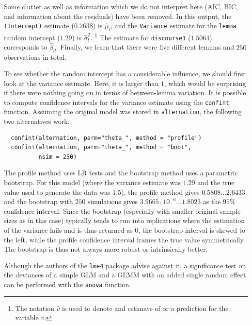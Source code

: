 \documentclass[a4paper,12pt]{article}
\begin{document}
Some clutter as well as information which we do not interpret here (AIC, BIC, and information about the residuals) have been removed.
In this output, the \texttt{(Intercept)} estimate ($0.7638$) is $\hat{\mu}_l$, and the \texttt{Variance} estimate for the \texttt{lemma} random intercept ($1.29$) is $\hat{\sigma}_l^2$.%
\footnote{The notation $\hat{v}$ is used to denote and estimate of or a prediction for the variable $v$.}
The estimate for \texttt{discourse1} ($1.5064$) corresponds to $\hat{\beta}_d$.
Finally, we learn that there were five different lemmas and $250$ observations in total.

To see whether the random intercept has a considerable influence, we should first look at the variance estimate.
Here, it is larger than $1$, which would be surprising if there were nothing going on in terms of between-lemma variation.
It is possible to compute confidence intervals for the variance estimate using the \texttt{confint} function.
Assuming the original model was stored in \texttt{alternation}, the following two alternatives work.

\vspace{0.5\baselineskip}

\begin{lstlisting}
  confint(alternation, parm="theta_", method = "profile")
  confint(alternation, parm="theta_", method = "boot",
          nsim = 250)
\end{lstlisting}

The profile method uses LR tests and the bootstrap method uses a parametric bootstrap.
For this model (where the variance estimate was $1.29$ and the true value used to generate the data was $1.5$), the profile method gives $0.5808\dots2.6433$ and the bootstrap with $250$ simulations gives $3.9665\cdot10^{-6}\dots1.8023$ as the $95\%$ confidence interval.
Since the bootstrap (especially with smaller original sample sizes as in this case) typically tends to run into replications where the estimation of the variance fails and is thus returned as $0$, the bootstrap interval is skewed to the left, while the profile confidence interval frames the true value symmetrically.
The bootstrap is thus not always more robust or intrinsically better.

Although the authors of the \texttt{lme4} package advise against it, a significance test on the deviances of a simple GLM and a GLMM with an added single random effect can be performed with the \texttt{anova} function.

\vspace{0.5\baselineskip}
\end{document}
